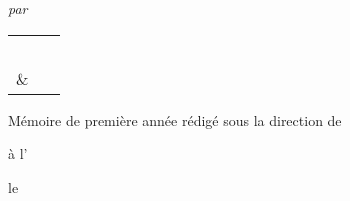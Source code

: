 \makeatletter
\thispagestyle{empty}
	\begin{center}
		\noindent\hrulefill
		\vspace{0.7cm}
		
		\begin{minipage}[c]{0.7\textwidth}
			\bf\LARGE
			\begin{center}
				\@title{}
			\end{center}
		\end{minipage}

		\vspace{0.7cm}
		\noindent\hrulefill	
		
		{
			\large
			\textit{par}
			
			\vspace{0.4cm}
			\begin{tabular}{rl}
					& \authorOneFisrtName{}~{\sc\authorOneFamilyName{}}\\
				\& 	& \authorTwoFisrtName{}~{\sc\authorTwoFamilyName{}}
			\end{tabular}
		}
		
		Mémoire de première année rédigé sous la direction de~\supervisorFirstName{}~{\sc\supervisorFamilyName{}}
		
		à l'\instituteName{}
		
		
		le \dateName{}
	\end{center}
\restoregeometry
\makeatother

